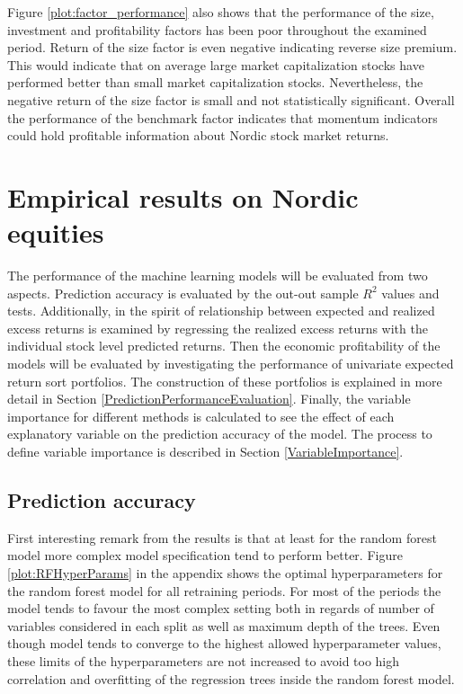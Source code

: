 \documentclass[12pt]{article}
\begin{document}
Figure \ref{plot:factor_performance} also shows that the performance of the size, investment and profitability factors has been poor throughout the examined period. Return of the size factor is even negative indicating reverse size premium. This would indicate that on average large market capitalization stocks have performed better than small market capitalization stocks. Nevertheless, the negative return of the size factor is small and not statistically significant. Overall the performance of the benchmark factor indicates that momentum indicators could hold profitable information about Nordic stock market returns. \par

\section{Empirical results on Nordic equities}

The performance of the machine learning models will be evaluated from two aspects. Prediction accuracy is evaluated by the out-out sample $R^2$ values and \citet{Diebold1995} tests. Additionally, in the spirit of \citet{Lewellen2015} relationship between expected and realized excess returns is examined by regressing the realized excess returns with the individual stock level predicted returns.\footnotemark {} Then the economic profitability of the models will be evaluated by investigating the performance of univariate expected return sort portfolios. The construction of these portfolios is explained in more detail in Section \ref{PredictionPerformanceEvaluation}. Finally, the variable importance for different methods is calculated to see the effect of each explanatory variable on the prediction accuracy of the model. The process to define variable importance is described in Section \ref{VariableImportance}. \par

\subsection{Prediction accuracy}\label{PredictionAccuracy}

First interesting remark from the results is that at least for the random forest model more complex model specification tend to perform better. Figure \ref{plot:RFHyperParams} in the appendix shows the optimal hyperparameters for the random forest model for all retraining periods. For most of the periods the model tends to favour the most complex setting both in regards of number of variables considered in each split as well as maximum depth of the trees. Even though model tends to converge to the highest allowed hyperparameter values, these limits of the hyperparameters are not increased to avoid too high correlation and overfitting of the regression trees inside the random forest model. \par
\end{document}
